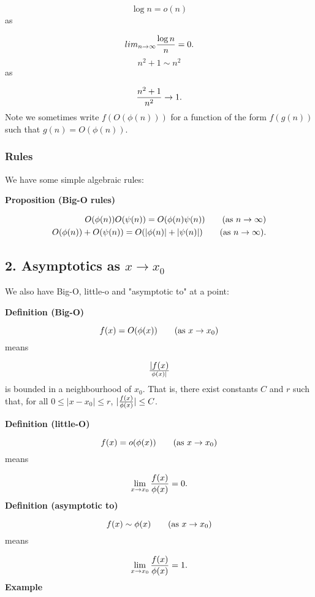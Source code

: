 \documentclass[12pt,a4paper]{article}
\begin{document}
\[
\log n = o(n)
\]
as

\[
lim_{n \ensuremath{\rightarrow} \ensuremath{\infty}} {\log n \over n} = 0.
\]
\[
n^2 + 1 \ensuremath{\sim} n^2
\]
as

\[
{n^2 +1 \over n^2} \ensuremath{\rightarrow} 1.
\]
Note we sometimes write $f(O(\ensuremath{\phi}(n)))$ for a function of the form $f(g(n))$ such that $g(n) = O(\ensuremath{\phi}(n))$.

\subsubsection{Rules}
We have some simple algebraic rules:

\textbf{Proposition (Big-O rules)}


\begin{align*}
O(\ensuremath{\phi}(n))O(\ensuremath{\psi}(n)) = O(\ensuremath{\phi}(n)\ensuremath{\psi}(n))  \qquad \hbox{(as $n \ensuremath{\rightarrow} \ensuremath{\infty}$)} \\
O(\ensuremath{\phi}(n)) + O(\ensuremath{\psi}(n)) = O(|\ensuremath{\phi}(n)| + |\ensuremath{\psi}(n)|)  \qquad \hbox{(as $n \ensuremath{\rightarrow} \ensuremath{\infty}$)}.
\end{align*}
\subsection{2. Asymptotics as $x \ensuremath{\rightarrow} x_0$}
We also have Big-O, little-o and "asymptotic to" at a point:

\textbf{Definition (Big-O)} 

\[
f(x) = O(\ensuremath{\phi}(x)) \qquad \hbox{(as $x \ensuremath{\rightarrow} x_0$)}
\]
means

\[
|f(x) \over \ensuremath{\phi}(x)|
\]
is bounded in a neighbourhood of $x_0$. That is, there exist constants $C$ and $r$ such  that, for all $0 \leq |x - x_0| \leq r$, $|{f(x) \over \ensuremath{\phi}(x)}| \leq C$.

\textbf{Definition (little-O)} 

\[
f(x) = o(\ensuremath{\phi}(x)) \qquad \hbox{(as $x \ensuremath{\rightarrow} x_0$)}
\]
means

\[
\lim_{x \ensuremath{\rightarrow} x_0} {f(x) \over \ensuremath{\phi}(x)} = 0.
\]
\textbf{Definition (asymptotic to)} 

\[
f(x) \ensuremath{\sim} \ensuremath{\phi}(x) \qquad \hbox{(as $x \ensuremath{\rightarrow} x_0$)}
\]
means

\[
\lim_{x \ensuremath{\rightarrow} x_0} {f(x) \over \ensuremath{\phi}(x)} = 1.
\]
\textbf{Example}
\end{document}
